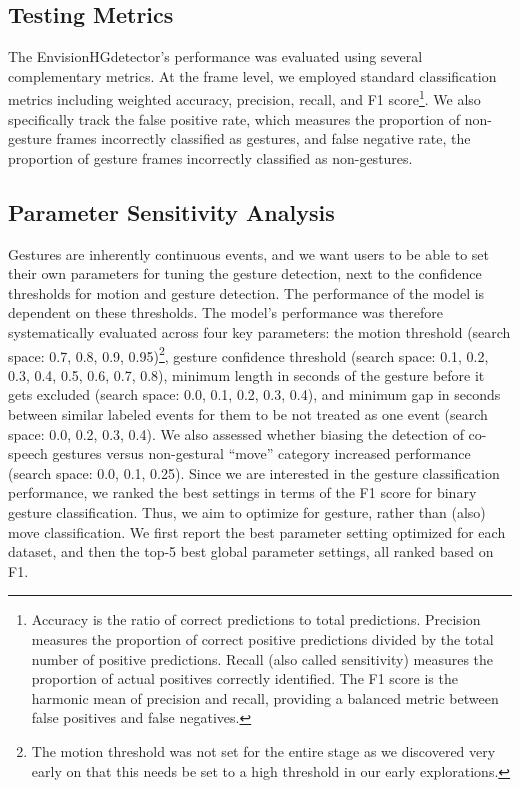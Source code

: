 \documentclass[11pt,smallheadings,cleardoublepage=empty,tocflat,numbers=noenddot,twoside,captions=tableheading]{scrbook}
\begin{document}
\begin{refsection}
\subsection{Testing Metrics}
The EnvisionHGdetector's performance was evaluated using several complementary metrics. At the frame level, we employed standard classification metrics including weighted accuracy, precision, recall, and F1 score\footnote{Accuracy is the ratio of correct predictions to total predictions. Precision measures the proportion of correct positive predictions divided by the total number of positive predictions. Recall (also called sensitivity) measures the proportion of actual positives correctly identified. The F1 score is the harmonic mean of precision and recall, providing a balanced metric between false positives and false negatives.}. We also specifically track the false positive rate, which measures the proportion of non-gesture frames incorrectly classified as gestures, and false negative rate, the proportion of gesture frames incorrectly classified as non-gestures.

\subsection{Parameter Sensitivity Analysis}
Gestures are inherently continuous events, and we want users to be able to set their own parameters for tuning the gesture detection, next to the confidence thresholds for motion and gesture detection. The performance of the model is dependent on these thresholds. The model's performance was therefore systematically evaluated across four key parameters: the motion threshold (search space: 0.7, 0.8, 0.9, 0.95)\footnote{The motion threshold was not set for the entire stage as we discovered very early on that this needs be set to a high threshold in our early explorations.}, gesture confidence threshold (search space: 0.1, 0.2, 0.3, 0.4, 0.5, 0.6, 0.7, 0.8), minimum length in seconds of the gesture before it gets excluded (search space: 0.0, 0.1, 0.2, 0.3, 0.4), and minimum gap in seconds between similar labeled events for them to be not treated as one event (search space: 0.0, 0.2, 0.3, 0.4). We also assessed whether biasing the detection of co-speech gestures versus non-gestural ``move'' category increased performance (search space: 0.0, 0.1, 0.25). Since we are interested in the gesture classification performance, we ranked the best settings in terms of the F1 score for binary gesture classification. Thus, we aim to optimize for gesture, rather than (also) move classification. We first report the best parameter setting optimized for each dataset, and then the top-5 best global parameter settings, all ranked based on F1.




\end{refsection}
\end{document}

